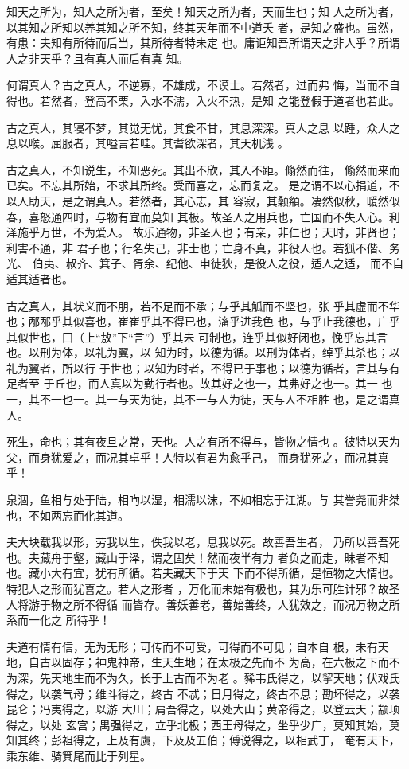 \documentclass[]{article}
\begin{document}
知天之所为，知人之所为者，至矣！知天之所为者，天而生也；知
人之所为者，以其知之所知以养其知之所不知，终其天年而不中道夭
者，是知之盛也。虽然，有患：夫知有所待而后当，其所待者特未定
也。庸讵知吾所谓天之非人乎？所谓人之非天乎？且有真人而后有真 知。

何谓真人？古之真人，不逆寡，不雄成，不谟士。若然者，过而弗
悔，当而不自得也。若然者，登高不栗，入水不濡，入火不热，是知
之能登假于道者也若此。

古之真人，其寝不梦，其觉无忧，其食不甘，其息深深。真人之息
以踵，众人之息以喉。屈服者，其嗌言若哇。其耆欲深者，其天机浅 。

古之真人，不知说生，不知恶死。其出不欣，其入不距。翛然而往，
翛然而来而已矣。不忘其所始，不求其所终。受而喜之，忘而复之。
是之谓不以心捐道，不以人助天，是之谓真人。若然者，其心志，其
容寂，其颡頯。凄然似秋，暖然似春，喜怒通四时，与物有宜而莫知
其极。故圣人之用兵也，亡国而不失人心。利泽施乎万世，不为爱人。
故乐通物，非圣人也；有亲，非仁也；天时，非贤也；利害不通，非
君子也；行名失己，非士也；亡身不真，非役人也。若狐不偕、务光、
伯夷、叔齐、箕子、胥余、纪他、申徒狄，是役人之役，适人之适，
而不自适其适者也。

古之真人，其状义而不朋，若不足而不承；与乎其觚而不坚也，张
乎其虚而不华也；邴邴乎其似喜也，崔崔乎其不得已也，滀乎进我色
也，与乎止我德也，广乎其似世也，囗（上``敖''下``言''）乎其未
可制也，连乎其似好闭也，悗乎忘其言也。以刑为体，以礼为翼，以
知为时，以德为循。以刑为体者，绰乎其杀也；以礼为翼者，所以行
于世也；以知为时者，不得已于事也；以德为循者，言其与有足者至
于丘也，而人真以为勤行者也。故其好之也一，其弗好之也一。其一
也一，其不一也一。其一与天为徒，其不一与人为徒，天与人不相胜
也，是之谓真人。

死生，命也；其有夜旦之常，天也。人之有所不得与，皆物之情也
。彼特以天为父，而身犹爱之，而况其卓乎！人特以有君为愈乎己，
而身犹死之，而况其真乎！

泉涸，鱼相与处于陆，相呴以湿，相濡以沫，不如相忘于江湖。与
其誉尧而非桀也，不如两忘而化其道。

夫大块载我以形，劳我以生，佚我以老，息我以死。故善吾生者，
乃所以善吾死也。夫藏舟于壑，藏山于泽，谓之固矣！然而夜半有力
者负之而走，昧者不知也。藏小大有宜，犹有所循。若夫藏天下于天
下而不得所循，是恒物之大情也。特犯人之形而犹喜之。若人之形者
，万化而未始有极也，其为乐可胜计邪？故圣人将游于物之所不得循
而皆存。善妖善老，善始善终，人犹效之，而况万物之所系而一化之 所待乎！

夫道有情有信，无为无形；可传而不可受，可得而不可见；自本自
根，未有天地，自古以固存；神鬼神帝，生天生地；在太极之先而不
为高，在六极之下而不为深，先天地生而不为久，长于上古而不为老
。豨韦氏得之，以挈天地；伏戏氏得之，以袭气母；维斗得之，终古
不忒；日月得之，终古不息；勘坏得之，以袭昆仑；冯夷得之，以游
大川；肩吾得之，以处大山；黄帝得之，以登云天；颛顼得之，以处
玄宫；禺强得之，立乎北极；西王母得之，坐乎少广，莫知其始，莫
知其终；彭祖得之，上及有虞，下及及五伯；傅说得之，以相武丁，
奄有天下，乘东维、骑箕尾而比于列星。
\end{document}
